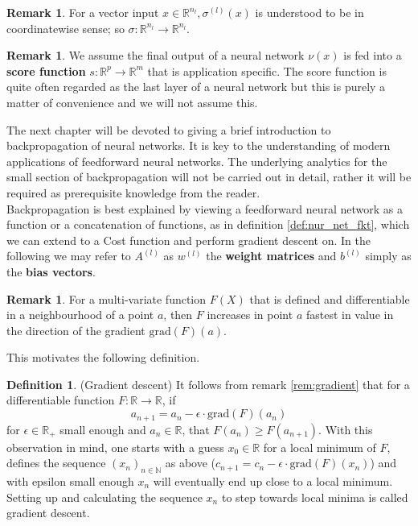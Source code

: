 \documentclass{article}
\theoremstyle{definition}
\newtheorem{definition}[theorem]{Definition}
\newtheorem{remark}[theorem]{Remark}
\begin{document}
\begin{remark}\hspace{1sp}\cite{zhang2018tropical}\label{rem:score_fkt}
For a vector input $x \in \mathbb{R}^{n_l}, \sigma^{(l)}(x)$ is understood to be in coordinatewise sense; so $\sigma : \mathbb{R}^{n_l} \to \mathbb{R}^{n_l}$.
\end{remark}
\begin{remark}\hspace{1sp}\cite{zhang2018tropical}
\label{rem:score_fkt}
We assume the final output of a neural network $\nu(x)$ is fed into a \textbf{score function} $s : \mathbb{R}^{p} \to \mathbb{R}^{m}$ that is application specific. The score function is quite often regarded as the last layer of a neural network but this is purely a matter of convenience and we will not assume this.
\end{remark}
The next chapter will be devoted to giving a brief introduction to backpropagation of neural networks. It is key to the understanding of modern applications of feedforward neural networks. The underlying analytics for the small section of backpropagation will not be carried out in detail, rather it will be required as prerequisite knowledge from the reader. \\
Backpropagation is best explained by viewing a feedforward neural network as a function or a concatenation of functions, as in definition \ref{def:nur_net_fkt}, which we can extend to a Cost function and perform gradient descent on.
In the following we may refer to $A^{(l)}$ as $w^{(l)}$ the \textbf{weight matrices} and $b^{(l)}$ simply as the \textbf{bias vectors}.

\begin{remark}
For a multi-variate function $F(X)$ that is defined and differentiable in a neighbourhood of a point $a$, then $F$ increases in point $a$ fastest in value in the direction of the gradient $\text{grad}(F)(a)$.
\end{remark}\label{rem:gradient}
This motivates the following definition.

\begin{definition}(Gradient descent)
It follows from remark \ref{rem:gradient} that for a differentiable function $F: \mathbb{R} \to \mathbb{R}$, if 
$$a_{n+1}=a_{n}-\epsilon \cdot \text{grad}(F)(a_{n})$$
for $\epsilon \in \mathbb{R}_{+}$ small enough and $a_{n} \in \mathbb{R}$, that $F(a_{n}) \geq F(a_{n+1})$. With this observation in mind, one starts with a guess $x_{0} \in \mathbb{R}$ for a local minimum of $F$, defines the sequence $(x_{n})_{n\in\mathbb{N}}$ as above ($c_{n+1}=c_{n}-\epsilon \cdot \text{grad}(F)(x_{n})$) and with epsilon small enough $x_{n}$ will eventually end up close to a local minimum. Setting up and calculating the sequence $x_{n}$ to step towards local minima is called gradient descent.
\end{definition}
\end{document}
